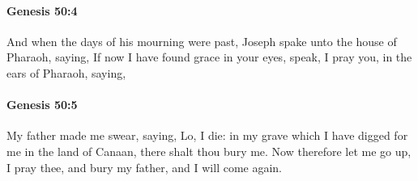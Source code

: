 		\paragraph{Genesis 50:4} %
			\label{GENESIS-50-4}

			And when the days of his mourning were past, Joseph spake unto the house of Pharaoh, saying, If now I have found grace in your eyes, speak, I pray you, in the ears of Pharaoh, saying,


		\paragraph{Genesis 50:5} %
			\label{GENESIS-50-5}

			My father made me swear, saying, Lo, I die: in my grave which I have digged for me in the land of Canaan, there shalt thou bury me. Now therefore let me go up, I pray thee, and bury my father, and I will come again.

